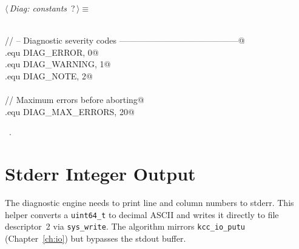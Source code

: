 \documentclass[11pt,a4paper,twoside,openright,DIV=15]{scrbook}
\theoremstyle{definition}
\theoremstyle{plain}
\theoremstyle{remark}
\begin{document}
\begin{flushleft} \small
\begin{minipage}{\linewidth}\label{scrap42}\raggedright\small
{} $\langle\,${\itshape Diag: constants}\nobreak\ {\footnotesize {?}}$\,\rangle\equiv$
\vspace{-1ex}
\begin{list}{}{} \item
\mbox{}\verb@@\\
\mbox{}\verb@// -- Diagnostic severity codes ------------------------------------------@\\
\mbox{}\verb@.equ DIAG_ERROR,       0@\\
\mbox{}\verb@.equ DIAG_WARNING,     1@\\
\mbox{}\verb@.equ DIAG_NOTE,        2@\\
\mbox{}\verb@@\\
\mbox{}\verb@// Maximum errors before aborting@\\
\mbox{}\verb@.equ DIAG_MAX_ERRORS, 20@\\
\mbox{}\verb@@{\NWsep}
\end{list}
\vspace{-1.5ex}
\footnotesize
\begin{list}{}{\setlength{\itemsep}{-\parsep}\setlength{\itemindent}{-\leftmargin}}
\item \NWtxtMacroRefIn\ .

\item{}
\end{list}
\end{minipage}\vspace{4ex}
\end{flushleft}
\section{Stderr Integer Output}

The diagnostic engine needs to print line and column numbers to stderr.
This helper converts a \texttt{uint64\_t} to decimal ASCII and writes
it directly to file descriptor~2 via \texttt{sys\_write}.  The algorithm
mirrors \texttt{kcc\_io\_putu} (Chapter~\ref{ch:io}) but bypasses the
stdout buffer.
\end{document}
